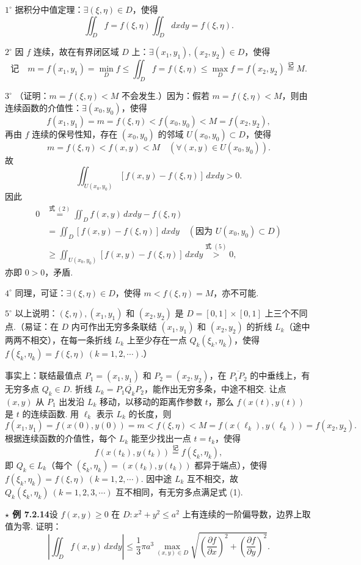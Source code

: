 \documentclass[UTF8, 12pt, fontset=fandol, oneside]{ctexart}
\begin{document}
$1^\circ$ 据积分中值定理：$\exists(\xi,\eta)\in D$，使得
\[
\iint_Df=f(\xi,\eta)\iint_Ddxdy=f(\xi,\eta). \tag{2}
\]

$2^\circ$ 因 $f$ 连续，故在有界闭区域 $D$ 上：$\exists(x_1,y_1),(x_2,y_2)\in D$，使得
\[
\text{记}\quad m=f(x_1,y_1)=\min_D f\le \iint_Df=f(\xi,\eta)\le\max_D f=f(x_2,y_2)\stackrel{\text{记}}=M. \tag{3}
\]

$3^\circ$ （证明：$m=f(\xi,\eta)<M$ 不会发生.）因为：假若 $m=f(\xi,\eta)<M$，则由连续函数的介值性：$\exists(x_0,y_0)$，使得
\[
f(x_1,y_1)=m=f(\xi,\eta)<f(x_0,y_0)<M=f(x_2,y_2), \tag{4}
\]
再由 $f$ 连续的保号性知，存在 $(x_0,y_0)$ 的邻域 $U(x_0,y_0)\subset D$，使得
\[
m=f(\xi,\eta)<f(x,y)<M\quad(\forall(x,y)\in U(x_0,y_0)).
\]
故
\[
\iint_{U(x_0,y_0)}[f(x,y)-f(\xi,\eta)]\,dxdy>0. \tag{5}
\]
因此
\[
\begin{aligned}
0&\stackrel{\text{式 }(2)}=\iint_D f(x,y)\,dxdy-f(\xi,\eta)\\
&=\iint_D[f(x,y)-f(\xi,\eta)]\,dxdy
\quad(\text{因为 }U(x_0,y_0)\subset D)\\
&\ge\iint_{U(x_0,y_0)}[f(x,y)-f(\xi,\eta)]\,dxdy
\stackrel{\text{式 }(5)}>0,
\end{aligned}
\tag{6}
\]
亦即 $0>0$，矛盾.

$4^\circ$ 同理，可证：$\exists(\xi,\eta)\in D$，使得 $m<f(\xi,\eta)=M$，亦不可能.

$5^\circ$ 以上说明：$(\xi,\eta),(x_1,y_1)$ 和 $(x_2,y_2)$ 是 $D=[0,1]\times[0,1]$ 上三个不同点.（易证：在 $D$ 内可作出无穷多条联结 $(x_1,y_1)$ 和 $(x_2,y_2)$ 的折线 $L_k$（途中两两不相交），在每一条折线 $L_k$ 上至少存在一点 $Q_k(\xi_k,\eta_k)$，使得 $f(\xi_k,\eta_k)=f(\xi,\eta)\ (k=1,2,\cdots)$.）

事实上：联结最值点 $P_1=(x_1,y_1)$ 和 $P_2=(x_2,y_2)$，在 $\overline{P_1P_2}$ 的中垂线上，有无穷多点 $Q_k\in D$. 折线 $L_k=\overline{P_1Q_kP_2}$，能作出无穷多条，中途不相交. 让点 $(x,y)$ 从 $P_1$ 出发沿 $L_k$ 移动，以移动的距离作参数 $t$，那么 $f(x(t),y(t))$ 是 $t$ 的连续函数. 用 $\ell_k$ 表示 $L_k$ 的长度，则
\[
f(x_1,y_1)=f(x(0),y(0))=m<f(\xi,\eta)<M=f(x(\ell_k),y(\ell_k))=f(x_2,y_2).
\]
根据连续函数的介值性，每个 $L_k$ 能至少找出一点 $t=t_k$，使得
\[
f(x(t_k),y(t_k))\stackrel{\text{记}}=f(\xi_k,\eta_k),
\]
即 $Q_k\in L_k$（每个 $(\xi_k,\eta_k)=(x(t_k),y(t_k))$ 都异于端点），使得 $f(\xi_k,\eta_k)=f(\xi,\eta)\ (k=1,2,\cdots)$. 因中途 $L_k$ 互不相交，故 $Q_k(\xi_k,\eta_k)\ (k=1,2,3,\cdots)$ 互不相同，有无穷多点满足式 (1).

\noindent\textbf{$\star$ 例 7.2.14}\quad 设 $f(x,y)\ge0$ 在 $D:x^2+y^2\le a^2$ 上有连续的一阶偏导数，边界上取值为零. 证明：
\[
\left|\iint_D f(x,y)\,dxdy\right|
\le\frac13\pi a^3\max_{(x,y)\in D}\sqrt{\left(\frac{\partial f}{\partial x}\right)^2+\left(\frac{\partial f}{\partial y}\right)^2}.
\]
\end{document}
